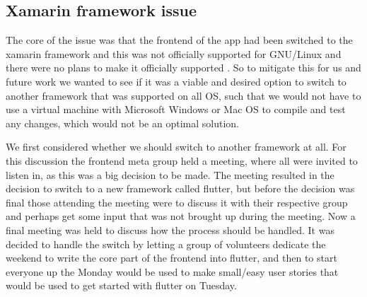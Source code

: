 \subsection{Xamarin framework issue}
The core of the issue was that the frontend of the app had been switched to the xamarin framework and this was not officially supported for GNU/Linux and there were no plans to make it officially supported \cite{xamarinSupport}.
So to mitigate this for us and future work we wanted to see if it was a viable and desired option to switch to another framework that was supported on all OS, such that we would not have to use a virtual machine with Microsoft Windows or Mac OS to compile and test any changes, which would not be an optimal solution.

We first considered whether we should switch to another framework at all.
For this discussion the frontend meta group held a meeting, where all were invited to listen in, as this was a big decision to be made.
The meeting resulted in the decision to switch to a new framework called flutter, but before the decision was final those attending the meeting were to discuss it with their respective group and perhaps get some input that was not brought up during the meeting.
Now a final meeting was held to discuss how the process should be handled.
It was decided to handle the switch by letting a group of volunteers dedicate the weekend to write the core part of the frontend into flutter, and then to start everyone up the Monday would be used to make small/easy user stories that would be used to get started with flutter on Tuesday.
